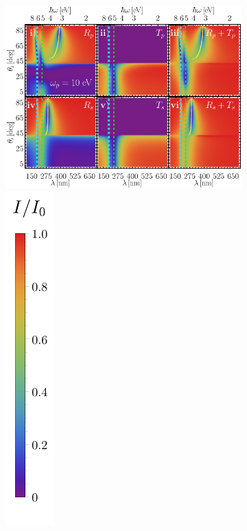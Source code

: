 \begin{figure}[h!]
\begin{subfigure}{.7\linewidth}
	\end{subfigure}\\
	\begin{subfigure}{.01\linewidth}\caption{}\label{sfig:RT-10}\vspace{6.5cm}\end{subfigure}\hspace*{-.5em}
	\begin{subfigure}{.7\linewidth}\centering
	\includegraphics[scale=.65 ]{2-Resultados/figs/5-RT-Wp4-10/0-2D_Grid_2.png}%
		\includegraphics[scale=1, trim={00 -5 00 00}, clip]{2-Resultados/figs/0-IBar_v}

\end{subfigure}
\end{figure}
